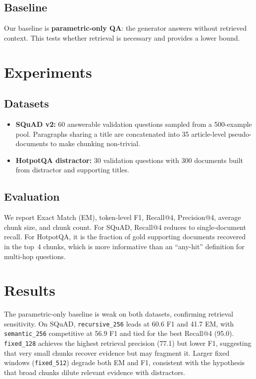 \documentclass[11pt]{article}
\begin{document}
\subsection{Baseline}

Our baseline is \textbf{parametric-only QA}: the generator answers without retrieved context. This tests whether retrieval is necessary and provides a lower bound.

\section{Experiments}

\subsection{Datasets}

\begin{itemize}
  \item \textbf{SQuAD v2:} 60 answerable validation questions sampled from a 500-example pool. Paragraphs sharing a title are concatenated into 35 article-level pseudo-documents to make chunking non-trivial.
  \item \textbf{HotpotQA distractor:} 30 validation questions with 300 documents built from distractor and supporting titles.
\end{itemize}

\subsection{Evaluation}

We report Exact Match (EM), token-level F1, Recall@4, Precision@4, average chunk size, and chunk count. For SQuAD, Recall@4 reduces to single-document recall. For HotpotQA, it is the fraction of gold supporting documents recovered in the top~4 chunks, which is more informative than an ``any-hit'' definition for multi-hop questions.

\section{Results}



The parametric-only baseline is weak on both datasets, confirming retrieval sensitivity. On SQuAD, \texttt{recursive\_256} leads at 60.6 F1 and 41.7 EM, with \texttt{semantic\_256} competitive at 56.9 F1 and tied for the best Recall@4 (95.0). \texttt{fixed\_128} achieves the highest retrieval precision (77.1) but lower F1, suggesting that very small chunks recover evidence but may fragment it. Larger fixed windows (\texttt{fixed\_512}) degrade both EM and F1, consistent with the hypothesis that broad chunks dilute relevant evidence with distractors.
\end{document}
